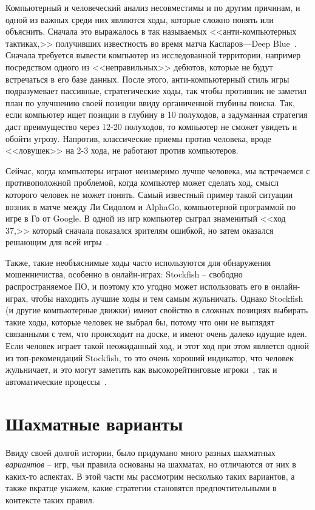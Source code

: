 \documentclass{article}
\begin{document}
Компьютерный и человеческий анализ несовместимы и по другим причинам,
и одной из важных среди них являются ходы, которые сложно понять или объяснить.
Сначала это выражалось в так называемых <<анти-компьютерных тактиках,>>
получивших известность во время матча Каспаров---Deep Blue~\cite{kasparov-anti-computer-chess}.
Сначала требуется вывести компьютер из исследованной территории,
например посредством одного из <<неправильных>> дебютов,
которые не будут встречаться в его базе данных.
После этого, анти-компьютерный стиль игры подразумевает пассивные, стратегические ходы,
так чтобы противник не заметил план по улучшению своей позиции ввиду органиченной глубины поиска.
Так, если компьютер ищет позиции в глубину в 10 полуходов, а задуманная стратегия даст преимущество через
12-20 полуходов, то компьютер не сможет увидеть и обойти угрозу.
Напротив, классические приемы против человека, вроде <<ловушек>> на 2-3 хода,
не работают против компьютеров.

Сейчас, когда компьютеры играют неизмеримо лучше человека,
мы встречаемся с противоположной проблемой,
когда компьютер может сделать ход,
смысл которого человек не может понять.
Самый известный пример такой ситуации возник в матче между Ли Сидолом и AlphaGo,
компьютерной программой по игре в Го от Google.
В одной из игр компьютер сыграл знаменитый <<ход 37,>>
который сначала показался зрителям ошибкой,
но затем оказался решающим для всей игры~\cite{wired-alphago}.

Также, такие необъяснимые ходы часто используются для обнаружения
мошенничиства, особенно в онлайн-играх:
Stockfish -- свободно распространяемое ПО,
и поэтому кто угодно может использовать его в онлайн-играх,
чтобы находить лучшие ходы и тем самым жульничать.
Однако Stockfish (и другие компьютерные движки)
имеют свойство в сложных позициях выбирать такие ходы, которые человек не выбрал бы,
потому что они не выглядят связанными с тем, что происходит на доске,
и имеют очень далеко идущие идеи.
Если человек играет такой неожиданный ход, и этот ход при этом
является одной из топ-рекомендаций Stockfish,
то это очень хороший индикатор, что человек жульничает,
и это могут заметить как высокорейтинговые игроки~\cite{gothamchess-cheater-exposed},
так и автоматические процессы~\cite{lichess-kaladin}.

\section{Шахматные варианты}

Ввиду своей долгой истории, было придумано много разных шахматных \emph{вариантов} --
игр, чьи правила основаны на шахматах, но отличаются от них в каких-то аспектах.
В этой части мы рассмотрим несколько таких вариантов, 
а также вкратце укажем, какие стратегии становятся предпочтительными в контексте таких правил.
\end{document}
